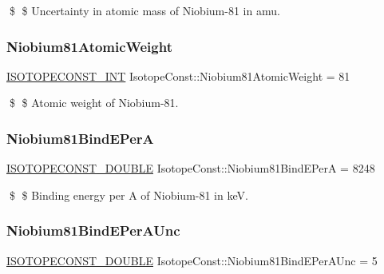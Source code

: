 \$ \$ Uncertainty in atomic mass of Niobium-\/81 in amu. \mbox{\label{group___isotope_const-_niobium-_nb81_ga7bcc9b121226ed7f84d8df7a2d1ba166}} 
\subsubsection{\texorpdfstring{Niobium81\+Atomic\+Weight}{Niobium81AtomicWeight}}
{\footnotesize\ttfamily \mbox{\hyperlink{group___isotope_const-_macros_ga5f18360b3e99483a35c32d789e62621c}{I\+S\+O\+T\+O\+P\+E\+C\+O\+N\+S\+T\+\_\+\+I\+NT}} Isotope\+Const\+::\+Niobium81\+Atomic\+Weight = 81}

\$ \$ Atomic weight of Niobium-\/81. \mbox{\label{group___isotope_const-_niobium-_nb81_ga89dec5e2b4c1e8a4e2d0336210cd4188}} 
\subsubsection{\texorpdfstring{Niobium81\+Bind\+E\+PerA}{Niobium81BindEPerA}}
{\footnotesize\ttfamily \mbox{\hyperlink{group___isotope_const-_macros_ga8f45a7272ce02c0b4c65c44636ed719a}{I\+S\+O\+T\+O\+P\+E\+C\+O\+N\+S\+T\+\_\+\+D\+O\+U\+B\+LE}} Isotope\+Const\+::\+Niobium81\+Bind\+E\+PerA = 8248}

\$ \$ Binding energy per A of Niobium-\/81 in keV. \mbox{\label{group___isotope_const-_niobium-_nb81_gaf7950615c2f8d50d77880ebcd6ea39b6}} 
\subsubsection{\texorpdfstring{Niobium81\+Bind\+E\+Per\+A\+Unc}{Niobium81BindEPerAUnc}}
{\footnotesize\ttfamily \mbox{\hyperlink{group___isotope_const-_macros_ga8f45a7272ce02c0b4c65c44636ed719a}{I\+S\+O\+T\+O\+P\+E\+C\+O\+N\+S\+T\+\_\+\+D\+O\+U\+B\+LE}} Isotope\+Const\+::\+Niobium81\+Bind\+E\+Per\+A\+Unc = 5}

